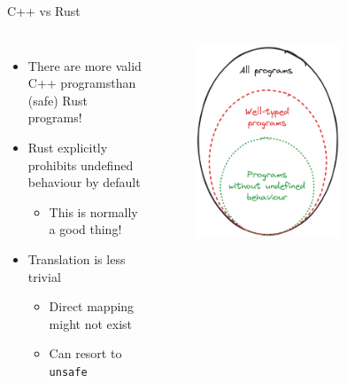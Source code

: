 \documentclass[10pt,aspectratio=169]{beamer}
\begin{document}
\begin{frame}{C++ vs Rust}
    \begin{columns}[onlytextwidth]
        \centering
            \begin{itemize}
                \item There are more valid C++ programs\newline than (safe) Rust programs!
                \item Rust explicitly prohibits undefined behaviour by default
                \begin{itemize}
                    \item This is normally a good thing!
                \end{itemize}
                \item Translation is less trivial
                \begin{itemize}
                    \item Direct mapping might not exist
                    \item Can resort to \texttt{unsafe} %
                \end{itemize}
            \end{itemize}
            \begin{figure}[H]
                \includegraphics[width=0.65\textwidth]{images/excalidraw_programs_venn.png}

\end{figure}
\end{columns}
\end{frame}
\end{document}
